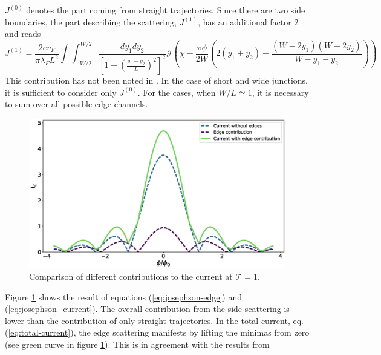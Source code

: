 $J^{(0)}$ denotes the part coming from straight trajectories. Since there are two side boundaries, the part describing the scattering, $J^{(1)}$, has an additional factor 2 and reads
\begin{equation}
J^{(1)} = \frac{2 e v_F}{\pi \lambda_F L^2} \int \int_{-W/2}^{W/2} \frac{d y_1 d y_2}{ \left[ 1 + \left(\frac{y_1 - y_2}{L}\right)^2\right]^{2}} \mathcal{J} \left( \chi - \frac{\pi \phi}{2 W} \left( 2 (y_1 + y_2) - \frac{(W-2y_1)(W-2y_2)}{W - y_1 - y_2} \right)\right) \label{eq:josephson-edge}
\end{equation}
This contribution has not been noted in \cite{Meier2016}. In the case of short and wide junctions, it is sufficient to consider only $J^{(0)}$. For the cases, when $W / L \simeq 1$, it is necessary to sum over all possible edge channels.
\begin{figure}
\centering
\includegraphics[width=\textwidth]{figure/analyticalmodel/plane-setup-edge-contribution}
\caption{Comparison of different contributions to the current at $\mathcal{T} =1$. }\label{fig:plane-edge-contribution}
\end{figure}
Figure \ref{fig:plane-edge-contribution} shows the result of equations (\ref{eq:josephson-edge}) and (\ref{eq:josephson_current}). The overall contribution from the side scattering is lower than the contribution of only straight trajectories. In the total current, eq. (\ref{eq:total-current}), the edge scattering manifests by lifting the minimas from zero (see green curve in figure \ref{fig:plane-edge-contribution}). This is in agreement with the results from \cite{Meier2016}

